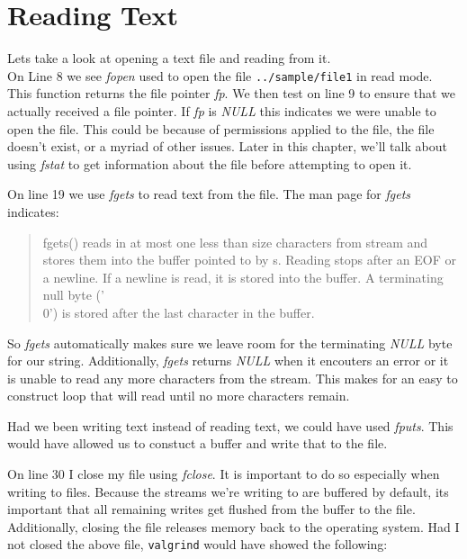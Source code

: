 \documentclass[../main.tex]{subfiles}
\begin{document}
	\section{Reading Text}
	
	Lets take a look at opening a text file and reading from it.\\
	
	
	
	On Line 8 we see \textit{fopen} used to open the file \texttt{../sample/file1} in read mode.  This function returns the file pointer \textit{fp}.  We then test on line 9 to ensure that we actually received a file pointer.  If \textit{fp} is \textit{NULL} this indicates we were unable to open the file.  This could be because of permissions applied to the file, the file doesn't exist, or a myriad of other issues.  Later in this chapter, we'll talk about using \textit{fstat} to get information about the file before attempting to open it.
	
	On line 19 we use \textit{fgets} to read text from the file.  The man page for \textit{fgets} indicates:
	
	\begin{quotation}
		fgets() reads in at most one less than size characters from stream and stores them into the buffer pointed to by s.  Reading stops after an EOF or a newline.  If a newline is read, it is stored into the buffer.  A terminating null byte ('\\0') is stored after the last character in the buffer.
	\end{quotation}

	So \textit{fgets} automatically makes sure we leave room for the terminating \textit{NULL} byte for our string.  Additionally, \textit{fgets} returns \textit{NULL} when it encouters an error or it is unable to read any more characters from the stream.  This makes for an easy to construct loop that will read until no more characters remain.
	
	Had we been writing text instead of reading text, we could have used \textit{fputs}.  This would have allowed us to constuct a buffer and write that to the file.
	
	On line 30 I close my file using \textit{fclose}.  It is important to do so especially when writing to files.  Because the streams we're writing to are buffered by default, its important that all remaining writes get flushed from the buffer to the file.  Additionally, closing the file releases memory back to the operating system.  Had I not closed the above file, \texttt{valgrind} would have showed the following:
	
\end{document}
